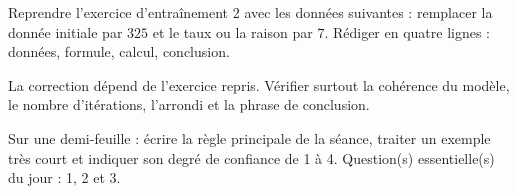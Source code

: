 
    \begin{homework}Reprendre l'exercice d'entraînement 2 avec les données suivantes : remplacer la donnée initiale par $325$ et le taux ou la raison par $7$. Rédiger en quatre lignes : données, formule, calcul, conclusion.\end{homework}
    \begin{solution}La correction dépend de l'exercice repris. Vérifier surtout la cohérence du modèle, le nombre d'itérations, l'arrondi et la phrase de conclusion.\end{solution}

    \begin{exitticket}[3 minutes]Sur une demi-feuille : écrire la règle principale de la séance, traiter un exemple très court et indiquer son degré de confiance de 1 à 4. Question(s) essentielle(s) du jour : 1, 2 et 3.\end{exitticket}

